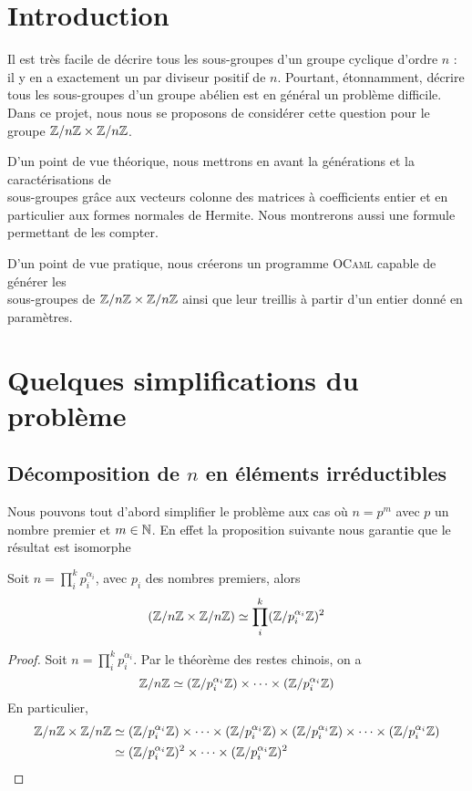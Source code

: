 \documentclass[11pt]{article}
\begin{document}

\tableofcontents
\newpage

\section{Introduction}
	Il est très facile de décrire tous les sous-groupes d'un groupe cyclique
	d'ordre $n$ : il y en a exactement un par diviseur positif de $n$.
	Pourtant, étonnamment, décrire tous les sous-groupes d'un groupe abélien
	est en général un problème difficile.\\
	Dans ce projet, nous nous se proposons de considérer cette question pour le groupe $\mathbb Z/n\mathbb Z \times \mathbb Z/n\mathbb Z$.

	D'un point de vue théorique, nous mettrons en avant la générations et la caractérisations de \\
	sous-groupes grâce aux vecteurs colonne des matrices à coefficients entier et en particulier aux formes
	normales de Hermite. Nous montrerons aussi une formule permettant de les compter.

	D'un point de vue pratique, nous créerons un programme \textsc{OCaml} capable de générer les\\
	sous-groupes de $\mathbb Z/n\mathbb Z \times \mathbb Z/n\mathbb Z$ ainsi que leur treillis à partir d'un entier donné en paramètres.
\section{Quelques simplifications du problème}
\subsection{Décomposition de $n$ en éléments irréductibles}

Nous pouvons tout d'abord simplifier le problème aux cas où $n = p^m$ avec $p$ un nombre premier
et $m \in \mathbb N$. En effet la proposition suivante nous garantie que le résultat est isomorphe
\begin{proposition}
	Soit $n = \prod\limits_i^k p_i^{\alpha_i}$, avec $p_i$ des nombres premiers, alors
	$$(\mathbb Z/n\mathbb Z \times \mathbb Z/n\mathbb Z) \simeq \prod_i^k(\mathbb Z/p_i^{\alpha_i}\mathbb Z)^2$$
\end{proposition}

\begin{proof}
	Soit $n = \prod\limits_i^k p_i^{\alpha_i}$. Par le théorème des restes chinois, on a
	$$ \mathbb Z/n\mathbb Z \simeq (\mathbb Z/p_i^{\alpha_i}\mathbb Z) \times \cdots \times (\mathbb Z/p_i^{\alpha_i}\mathbb Z)$$
	En particulier,
	\begin{equation*}
		\begin{split}
			\mathbb Z/n\mathbb Z \times \mathbb Z/n\mathbb Z & \simeq
			(\mathbb Z/p_i^{\alpha_i}\mathbb Z) \times \cdots \times (\mathbb Z/p_i^{\alpha_i}\mathbb Z) \times (\mathbb Z/p_i^{\alpha_i}\mathbb Z) \times \cdots \times (\mathbb Z/p_i^{\alpha_i}\mathbb Z)\\
				& \simeq (\mathbb Z/p_i^{\alpha_i}\mathbb Z)^2 \times \cdots \times (\mathbb Z/p_i^{\alpha_i}\mathbb Z)^2
		\end{split}
	\end{equation*}
\end{proof}
\end{document}
